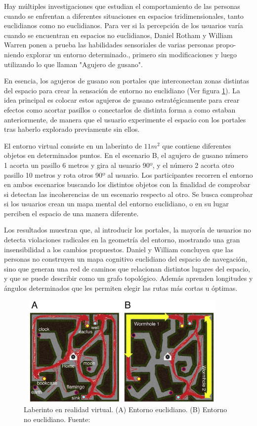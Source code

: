 \documentclass[../main.tex]{subfiles}
\begin{document}
Hay múltiples investigaciones que estudian el comportamiento de las personas cuando se enfrentan a diferentes situaciones en espacios tridimensionales, tanto euclidianos como no euclidianos. Para ver si la percepción de los usuarios varía cuando se encuentran en espacios no euclidianos, Daniel Rotham y William Warren \cite{Spacial_Perception_non_Euclidean} ponen a prueba las habilidades sensoriales de varias personas propo- niendo explorar un entorno determinado.,  primero sin modificaciones y luego utilizando lo que llaman "\uppercase{A}gujero de gusano".

En esencia, los agujeros de gusano son portales que interconectan zonas distintas del espacio para crear la sensación de entorno no euclidiano (Ver figura \ref{fig:Wormhole}). La idea principal es colocar estos agujeros de gusano estratégicamente para crear efectos como acortar pasillos o conectarlos de distinta forma a como estaban anteriormente, de manera que el usuario experimente el espacio con los portales tras haberlo explorado previamente sin ellos.

El entorno virtual consiste en un laberinto de $11 m^2$ que contiene diferentes objetos en determinados puntos. En el escenario B, el agujero de gusano número 1 acorta un pasillo 6 metros y gira al usuario 90º, y el número 2 acorta otro pasillo 10 metros y rota otros 90º al usuario. Los participantes recorren el entorno en ambos escenarios buscando los distintos objetos con la finalidad de comprobar si detectan las incoherencias de un escenario respecto al otro. Se busca comprobar si los usuarios crean un mapa mental del entorno euclidiano, o en su lugar perciben el espacio de una manera diferente.

Los resultados muestran que, al introducir los portales, la mayoría de usuarios no detecta violaciones radicales en la geometría del entorno, mostrando una gran insensibilidad a los cambios propuestos. Daniel y William concluyen que las personas no construyen un mapa cognitivo euclidiano del espacio de navegación, sino que generan una red de caminos que relacionan distintos lugares del espacio, y que se puede describir como un grafo topológico. Además aprenden longitudes y ángulos determinados que les permiten elegir las rutas más cortas u óptimas.

\begin{figure}[h!]
\centering
\includegraphics[width=10.5cm, height=5.5cm]{imagenes/Wormholes.jpg}
\caption{Laberinto en realidad virtual. (A) Entorno euclidiano. (B) Entorno no euclidiano. Fuente:\cite{Spacial_Perception_non_Euclidean}}
\label{fig:Wormhole}
\end{figure}
\end{document}

